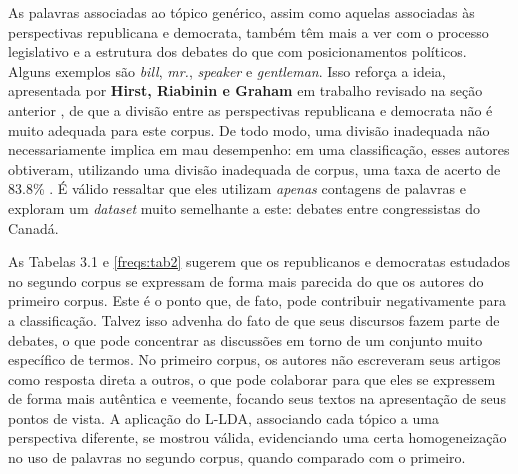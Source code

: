 As palavras associadas ao tópico genérico, assim como aquelas associadas às perspectivas republicana e democrata, também têm mais a ver com o processo legislativo e a estrutura dos debates do que com posicionamentos políticos. Alguns exemplos são \emph{bill}, \emph{mr.}, \emph{speaker} e \emph{gentleman}. Isso reforça a ideia, apresentada por \textbf{Hirst, Riabinin e Graham} em trabalho revisado na seção anterior \cite{hirst-et-al}, de que a divisão entre as perspectivas republicana e democrata não é muito adequada para este corpus. De todo modo, uma divisão inadequada não necessariamente implica em mau desempenho: em uma classificação, esses autores obtiveram, utilizando uma divisão inadequada de corpus, uma taxa de acerto de 83.8\% \cite{hirst-et-al}. É válido ressaltar que eles utilizam \emph{apenas} contagens de palavras e exploram um \emph{dataset} muito semelhante a este: debates entre congressistas do Canadá. 

As Tabelas 3.1 e \ref{freqs:tab2} sugerem que os republicanos e democratas estudados no segundo corpus se expressam de forma mais parecida do que os autores do primeiro corpus. Este é o ponto que, de fato, pode contribuir negativamente para a classificação. Talvez isso advenha do fato de que seus discursos fazem parte de debates, o que pode concentrar as discussões em torno de um conjunto muito específico de termos. No primeiro corpus, os autores não escreveram seus artigos como resposta direta a outros, o que pode colaborar para que eles se expressem de forma mais autêntica e veemente, focando seus textos na apresentação de seus pontos de vista. A aplicação do L-LDA, associando cada tópico a uma perspectiva diferente, se mostrou válida, evidenciando uma certa homogeneização no uso de palavras no segundo corpus, quando comparado com o primeiro.


